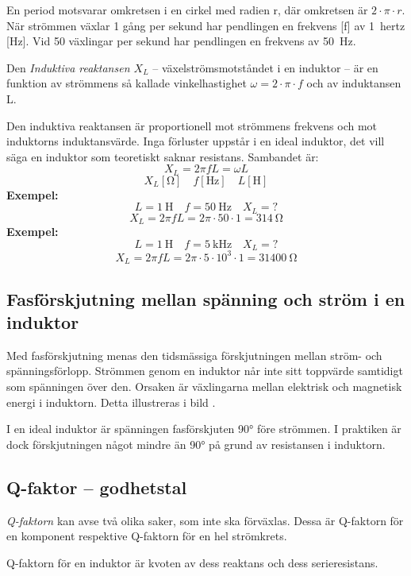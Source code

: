 En period motsvarar omkretsen i en cirkel med radien r, där omkretsen är
\(2 \cdot \pi  \cdot r\). När strömmen växlar 1 gång per sekund har
pendlingen en frekvens [f] av 1~hertz [Hz].
Vid 50 växlingar per sekund har pendlingen en frekvens av \qty{50}{\hertz}.

Den \emph{Induktiva reaktansen \(X_L\)} -- växelströmsmotståndet i en induktor -- 
är en funktion av strömmens så kallade vinkelhastighet \(\omega = 2 \cdot \pi  \cdot f\)
och av induktansen L.

Den induktiva reaktansen är proportionell mot strömmens frekvens och mot
induktorns induktansvärde. Inga förluster uppstår i en ideal induktor, det vill säga 
en induktor som teoretiskt saknar resistans.
Sambandet är:
\[X_L = 2\pi fL = \omega L\]
\[X_L [\unit{\ohm}] \quad f [\unit{\hertz}] \quad L [\unit{\henry}]\]
\textbf{Exempel:}
\[L = \qty{1}{\henry} \quad f = \qty{50}{\hertz} \quad X_L = ?\]
\[X_L = 2\pi fL = 2\pi \cdot 50 \cdot 1 = \qty{314}{\ohm}\]
\textbf{Exempel:}
\[L = \qty{1}{\henry} \quad f = \qty{5}{\kilo\hertz} \quad X_L = ?\]
\[X_L = 2\pi fL = 2\pi  \cdot 5 \cdot 10^3 \cdot 1 = \qty{31400}{\ohm}\]

\subsection{Fasförskjutning mellan spänning och ström i en induktor}

Med fasförskjutning menas den tidsmässiga förskjutningen mellan ström- och
spänningsförlopp. Strömmen genom en induktor når inte sitt toppvärde samtidigt
som spänningen över den. Orsaken är växlingarna mellan elektrisk och magnetisk
energi i induktorn.
Detta illustreras i bild .

I en ideal induktor är spänningen fasförskjuten \ang{90} före strömmen.
I praktiken är dock förskjutningen något mindre än \ang{90} på grund av
resistansen i induktorn.

\subsection{Q-faktor -- godhetstal}

\emph{Q-faktorn} kan avse två olika saker, som inte ska förväxlas.
Dessa är Q-faktorn för en komponent respektive Q-faktorn för en hel strömkrets.

Q-faktorn för en induktor är kvoten av dess reaktans och dess serieresistans.

